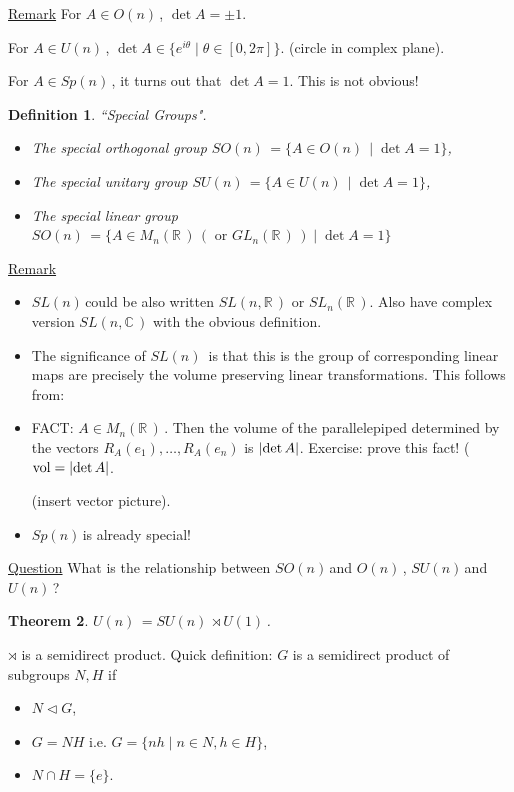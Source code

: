 \documentclass[12pt,a4paper]{article}
\newcommand{\rR}{\ensuremath{\mathbb{R}\,}}
\newcommand{\cC}{\ensuremath{\mathbb{C}\,}}
\newcommand{\mnr}{\ensuremath{M_n(\rR)\,}}
\newcommand{\glnr}{\ensuremath{GL_n(\rR)\,}}
\newcommand{\gon}{\ensuremath{O(n)\,}}
\newcommand{\gun}{\ensuremath{U(n)\,}}
\newcommand{\gspn}{\ensuremath{Sp(n)\,}}
\newcommand{\guk}[1]{\ensuremath{U(#1)\,}}
\newcommand{\gson}{\ensuremath{SO(n)\,}}
\newcommand{\gsun}{\ensuremath{SU(n)\,}}
\newcommand{\gsln}{\ensuremath{SL(n)\,}}
\newcommand{\ul}[1]{\underline{#1}}
\newtheorem{thm}{Theorem}[subsubsection]
\newtheorem{defn}[thm]{Definition}
\begin{document}
\ul{Remark} For $A\in \gon$, $\det A =\pm 1$. 

For $A\in \gun$, $\det A \in \{e^{i\theta}\mid \theta \in [0,2\pi]\}.$ (circle in complex plane).

For $A\in \gspn$, it turns out that $\det A=1$. This is not obvious!

\begin{defn}
``Special Groups".\\

\begin{itemize}
\item[1)] The special orthogonal group $\gson = \{A\in \gon\mid \det A=1\}$,
\item[2)] The special unitary group $\gsun = \{A\in \gun\mid \det A=1\}$,
\item[3)] The special linear group $\gson = \{A\in \mnr (\text{ or } \glnr)\mid \det A=1\}$
\end{itemize}
\end{defn}

\ul{Remark}
\begin{itemize}
\item[1.] \gsln could be also written $SL(n,\rR)$ or $SL_n(\rR)$. Also have complex version $SL(n,\cC)$ with the obvious definition.
\item[2.] The significance of $\gsln$ is that this is the group of corresponding linear maps are precisely the volume preserving linear transformations. This follows from:
\item[3.] FACT: $A\in \mnr$. Then the volume of the parallelepiped determined by the vectors $R_A(e_1),\ldots,R_A(e_n)$ is $\abs{\det A}$. Exercise: prove this fact! ($\mathrm{vol}=\abs{\det A}$.

(insert vector picture).
\item[4.] \gspn is already special!
\end{itemize}

\ul{Question} What is the relationship between \gson and \gon, \gsun and \gun ?

\begin{thm}
$\gun = \gsun \rtimes \guk{1}$.
\end{thm}

$\rtimes$ is a semidirect product. Quick definition: $G$ is a semidirect product of subgroups $N,H$ if 
\begin{itemize}
\item[1)] $N\lhd G$,
\item[2)] $G=NH$ i.e. $G=\{nh\mid n\in N, h\in H\}$,
\item[1)] $N\cap H =\{e\}$.
\end{itemize}
\end{document}
